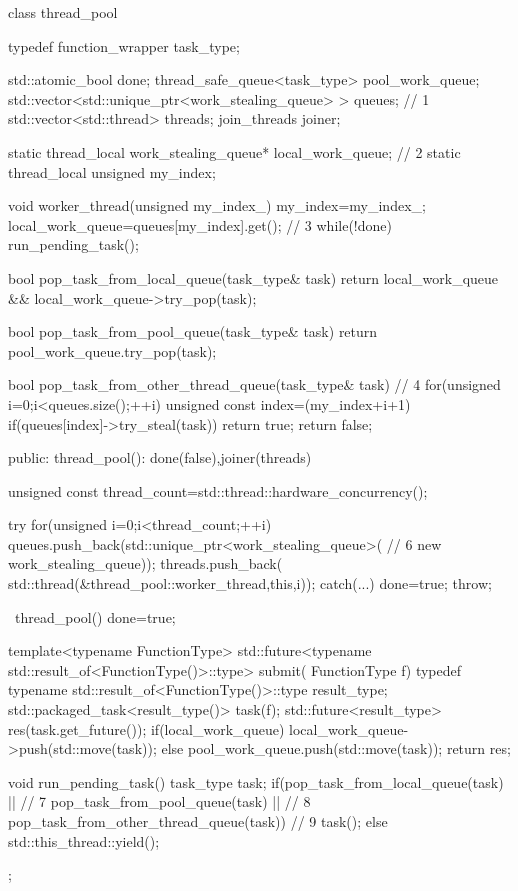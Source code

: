 \begin{cpp}
class thread_pool
{
  typedef function_wrapper task_type;

  std::atomic_bool done;
  thread_safe_queue<task_type> pool_work_queue;
  std::vector<std::unique_ptr<work_stealing_queue> > queues;  // 1
  std::vector<std::thread> threads;
  join_threads joiner;

  static thread_local work_stealing_queue* local_work_queue;  // 2
  static thread_local unsigned my_index;

  void worker_thread(unsigned my_index_)
  {
    my_index=my_index_;
    local_work_queue=queues[my_index].get();  // 3
    while(!done)
    {
      run_pending_task();
    }
  }

  bool pop_task_from_local_queue(task_type& task)
  {
    return local_work_queue && local_work_queue->try_pop(task);
  }

  bool pop_task_from_pool_queue(task_type& task)
  {
    return pool_work_queue.try_pop(task);
  }

  bool pop_task_from_other_thread_queue(task_type& task)  // 4
  {
    for(unsigned i=0;i<queues.size();++i)
    {
      unsigned const index=(my_index+i+1)%
      if(queues[index]->try_steal(task))
      {
        return true;
      }
    }
    return false;
  }

public:
  thread_pool():
    done(false),joiner(threads)
  {
    unsigned const thread_count=std::thread::hardware_concurrency();

    try
    {
      for(unsigned i=0;i<thread_count;++i)
      {
        queues.push_back(std::unique_ptr<work_stealing_queue>(  // 6
                         new work_stealing_queue));
        threads.push_back(
          std::thread(&thread_pool::worker_thread,this,i));
      }
    }
    catch(...)
    {
      done=true;
      throw;
    }
  }

  ~thread_pool()
  {
    done=true;
  }

  template<typename FunctionType>
  std::future<typename std::result_of<FunctionType()>::type> submit(
    FunctionType f)
  {
    typedef typename std::result_of<FunctionType()>::type result_type;
    std::packaged_task<result_type()> task(f);
    std::future<result_type> res(task.get_future());
    if(local_work_queue)
    {
      local_work_queue->push(std::move(task));
    }
    else
    {
      pool_work_queue.push(std::move(task));
    }
    return res;
  }

  void run_pending_task()
  {
    task_type task;
    if(pop_task_from_local_queue(task) ||  // 7
       pop_task_from_pool_queue(task) ||  // 8
       pop_task_from_other_thread_queue(task))  // 9
    {
      task();
    }
    else
    {
      std::this_thread::yield();
    }
  }
};
\end{cpp}

